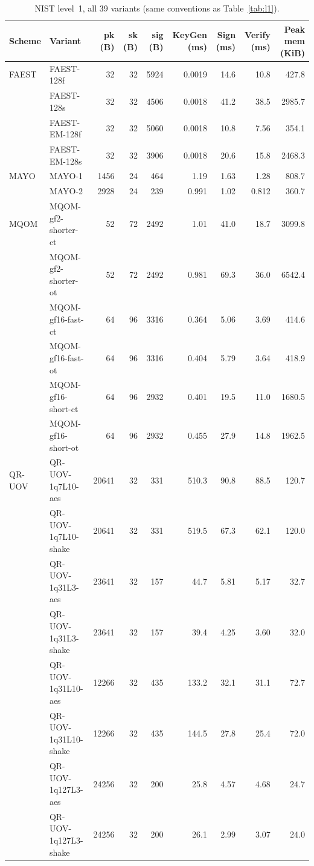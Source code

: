 \begin{table}[t]
\centering
\caption{NIST level~1, all 39 variants (same conventions as Table~\ref{tab:l1}).}
\label{tab:l1full}
\small
\begin{tabular}{llrrrrrrr}
\toprule
Scheme & Variant & pk (B) & sk (B) & sig (B) & KeyGen (ms) & Sign (ms) & Verify (ms) & Peak mem (KiB) \\
\midrule
FAEST & FAEST-128f & 32 & 32 & 5924 & 0.0019 & 14.6 & 10.8 & 427.8 \\
 & FAEST-128s & 32 & 32 & 4506 & 0.0018 & 41.2 & 38.5 & 2985.7 \\
 & FAEST-EM-128f & 32 & 32 & 5060 & 0.0018 & 10.8 & 7.56 & 354.1 \\
 & FAEST-EM-128s & 32 & 32 & 3906 & 0.0018 & 20.6 & 15.8 & 2468.3 \\
\midrule
MAYO & MAYO-1 & 1456 & 24 & 464 & 1.19 & 1.63 & 1.28 & 808.7 \\
 & MAYO-2 & 2928 & 24 & 239 & 0.991 & 1.02 & 0.812 & 360.7 \\
\midrule
MQOM & MQOM-gf2-shorter-ct & 52 & 72 & 2492 & 1.01 & 41.0 & 18.7 & 3099.8 \\
 & MQOM-gf2-shorter-ot & 52 & 72 & 2492 & 0.981 & 69.3 & 36.0 & 6542.4 \\
 & MQOM-gf16-fast-ct & 64 & 96 & 3316 & 0.364 & 5.06 & 3.69 & 414.6 \\
 & MQOM-gf16-fast-ot & 64 & 96 & 3316 & 0.404 & 5.79 & 3.64 & 418.9 \\
 & MQOM-gf16-short-ct & 64 & 96 & 2932 & 0.401 & 19.5 & 11.0 & 1680.5 \\
 & MQOM-gf16-short-ot & 64 & 96 & 2932 & 0.455 & 27.9 & 14.8 & 1962.5 \\
\midrule
QR-UOV & QR-UOV-1q7L10-aes & 20641 & 32 & 331 & 510.3 & 90.8 & 88.5 & 120.7 \\
 & QR-UOV-1q7L10-shake & 20641 & 32 & 331 & 519.5 & 67.3 & 62.1 & 120.0 \\
 & QR-UOV-1q31L3-aes & 23641 & 32 & 157 & 44.7 & 5.81 & 5.17 & 32.7 \\
 & QR-UOV-1q31L3-shake & 23641 & 32 & 157 & 39.4 & 4.25 & 3.60 & 32.0 \\
 & QR-UOV-1q31L10-aes & 12266 & 32 & 435 & 133.2 & 32.1 & 31.1 & 72.7 \\
 & QR-UOV-1q31L10-shake & 12266 & 32 & 435 & 144.5 & 27.8 & 25.4 & 72.0 \\
 & QR-UOV-1q127L3-aes & 24256 & 32 & 200 & 25.8 & 4.57 & 4.68 & 24.7 \\
 & QR-UOV-1q127L3-shake & 24256 & 32 & 200 & 26.1 & 2.99 & 3.07 & 24.0 \\

\end{tabular}
\end{table}
